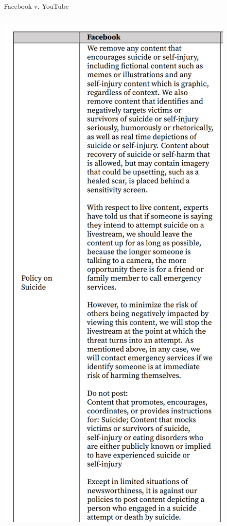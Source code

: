 \documentclass[nobackground,dvipsnames,table]{beamer}
\begin{document}
\begin{frame}{Facebook v. YouTube}
    \begin{columns}
            \includegraphics[width=\textwidth]{policy-on-suicide-facebook}

\end{columns}
\end{frame}
\end{document}
